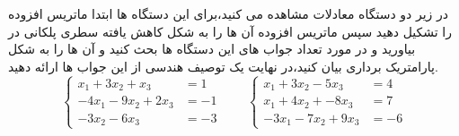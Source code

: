 \documentclass{article}
\begin{document}


در زیر دو دستگاه معادلات مشاهده می کنید،برای این دستگاه ها ابتدا ماتریس افزوده را تشکیل دهید سپس ماتریس افزوده آن ها را به شکل کاهش یافته سطری پلکانی در بیاورید و در مورد تعداد جواب های این دستگاه ها بحث کنید و آن ها را به شکل پارامتریک برداری بیان کنید،در نهایت یک توصیف هندسی از این جواب ها ارائه دهید.
\begin{equation*}
\left\{
\begin{array}{rl}
 x_1+3x_2+x_3&=1\\
-4x_1-9x_2+2x_3&=-1\\
-3x_2-6x_3&=-3
\end{array} \right.\qquad
\left\{
\begin{array}{rl}
 x_1+3x_2-5x_3&=4\\
x_1+4x_2+-8x_3&=7\\
-3x_1-7x_2+9x_3&=-6
\end{array} \right.
\end{equation*}
\end{document}
